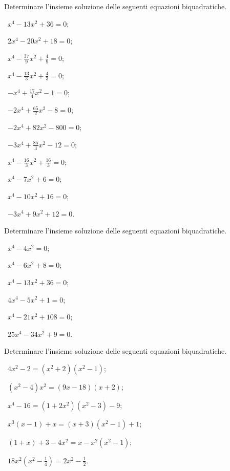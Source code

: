 \begin{esercizio}[\Ast]
\label{ese:5.18}
Determinare l'insieme soluzione delle seguenti equazioni biquadratiche.
\begin{multicols}{3}
 \begin{enumeratea}
 \item~$x^4-13x^2+36=0$;
 \item~$2x^4-20x^2+18=0$;
 \item~$x^4-\frac{37} 9x^2+\frac 4 9=0$;
 \item~$x^4-\frac{13} 3x^2+\frac 4 3=0$;
 \item~$-x^4+\frac{17} 4x^2-1=0$;
 \item~$-2x^4+\frac{65} 2x^2-8=0$;
 \item~$-2x^4+82x^2-800=0$;
 \item~$-3x^4+\frac{85} 3x^2-12=0$;
 \item~$x^4-\frac{16} 3x^2+\frac{16} 3=0$;
 \item~$x^4-7x^2+6=0$;
 \item~$x^4-10x^2+16=0$;
 \item~$-3x^4+9x^2+12=0$.
 \end{enumeratea}
\end{multicols}
\end{esercizio}

\begin{esercizio}[\Ast]
\label{ese:5.19}
Determinare l'insieme soluzione delle seguenti equazioni biquadratiche.
\begin{multicols}{3}
 \begin{enumeratea}
 \item~$x^4-4x^2=0$;
 \item~$x^4-6x^2+8=0$;
 \item~$x^4-13x^2+36=0$;
 \item~$4x^4-5x^2+1=0$;
 \item~$x^4-21x^2+108=0$;
 \item~$25x^4-34x^2+9=0$.
 \end{enumeratea}
\end{multicols}
\end{esercizio}

\begin{esercizio}[\Ast]
\label{ese:5.20}
Determinare l'insieme soluzione delle seguenti equazioni biquadratiche.
\begin{multicols}{2}
 \begin{enumeratea}
 \item~$4x^2-2=\left(x^{2}+2\right)\left(x^{2}-1\right)$;
 \item~$\left(x^{2}-4\right)x^{2}=(9x-18)(x+2)$;
 \item~$x^{4}-16=\left(1+2x^{2}\right)\left(x^{2}-3\right)-9$;
 \item~$x^{3}(x-1)+x=(x+3)\left(x^{2}-1\right)+1$;
 \item~$(1+x)+3-4x^{2}=x-x^{2}\left(x^{2}-1\right)$;
 \item~$18x^{2}\left(x^{2}-\frac{1}{4}\right)=2x^{2}-\frac{1}{2}$.
 \end{enumeratea}
\end{multicols}
\end{esercizio}

